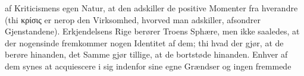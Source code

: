 \documentclass[12pt]{book}
\newcommand{\opage}[1]{\marginnote{\footnotesize\textit{[#1]}}}
\begin{document}
\opage{122} af Kriticismens egen Natur, at den adskiller de positive Momenter fra hverandre
(thi κρίσις er nerop den Virksomhed, hvorved man adskiller, afsondrer
Gjenstandene). Erkjendelsens Rige berører Troens Sphære, men ikke saaledes, at
der nogensinde fremkommer nogen Identitet af dem; thi hvad der gjør, at de
berøre hinanden, det Samme gjør tillige, at de bortstøde hinanden. Enhver af
dem synes at acquiescere i sig indenfor sine egne Grændser og ingen fremmede
\end{document}
